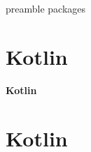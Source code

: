 \RequirePackage{import}
{preamble}
{packages}


    \section{Kotlin}\label{sec:kotlin}
    \begin{frame}[c]
        \centering
        \Large
        \textbf{Kotlin}
    \end{frame}

    \section{Kotlin}


